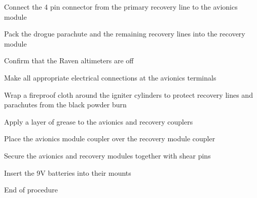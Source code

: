 \begin{checklist}
            \item Connect the 4 pin connector from the primary recovery line to the avionics module
            \item Pack the drogue parachute and the remaining recovery lines into the recovery module
            \item Confirm that the Raven altimeters are off
            \item Make all appropriate electrical connections at the avionics terminals
            \item Wrap a fireproof cloth around the igniter cylinders to protect recovery lines and parachutes from the black powder burn
            \item Apply a layer of grease to the avionics and recovery couplers
            \item Place the avionics module coupler over the recovery module coupler
            \item Secure the avionics and recovery modules together with shear pins
            \item Insert the 9V batteries into their mounts
            \item End of procedure
        \end{checklist}



